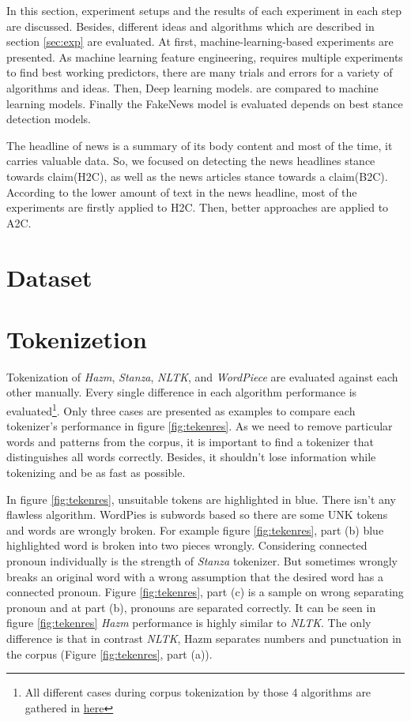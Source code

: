 In this section, experiment setups and the results of each experiment in each step are discussed. Besides, different ideas and algorithms which are described in section \ref{sec:exp} are evaluated. At first, machine-learning-based experiments are presented. As machine learning feature engineering, requires multiple experiments to find best working predictors, there are many trials and errors for a variety of algorithms and ideas. Then, Deep learning models. are compared to machine learning models. Finally the FakeNews model is evaluated depends on best stance detection models.

The headline of news is a summary of its body content and most of the time, it carries valuable data. So, we focused on detecting the news headlines stance towards claim(H2C), as well as the news articles stance towards a claim(B2C). According to the lower amount of text in the news headline, most of the experiments are firstly applied to H2C. Then, better approaches are applied to A2C.  


\section{Dataset}
\label{sec:dataset}



\section{Tokenizetion}
Tokenization of \textit{Hazm}, \textit{Stanza}, \textit{NLTK}, and \textit{WordPiece} are evaluated against each other manually. Every single difference in each algorithm performance is evaluated\footnote{All different cases during corpus tokenization by those 4 algorithms are gathered in \href{https://docs.google.com/document/d/1SlRBnoyLntLJ5yalWXZ1EqJ0wRj4DyiEMJdewkEkrTM/edit?usp=sharing}{here}}. Only three cases are presented as examples to compare each tokenizer's performance in figure \ref{fig:tekenres}. As we need to remove particular words and patterns from the corpus,  it is important to find a tokenizer that distinguishes all words correctly. Besides, it shouldn't lose information while tokenizing and be as fast as possible. 

In figure \ref{fig:tekenres}, unsuitable tokens are highlighted in blue. There isn't any flawless algorithm. WordPies is subwords based so there are some UNK tokens and words are wrongly broken. For example figure \ref{fig:tekenres}, part (b) blue highlighted word is broken into two pieces wrongly. Considering connected pronoun individually is the strength of \textit{Stanza} tokenizer. But sometimes  wrongly breaks an original word with a wrong assumption that the desired word has a connected pronoun. Figure \ref{fig:tekenres}, part (c) is a sample on wrong separating pronoun and at part (b), pronouns are separated correctly. It can be seen in figure \ref{fig:tekenres} \textit{Hazm} performance is highly similar to \textit{NLTK}. The only difference is that in contrast \textit{NLTK}, Hazm separates numbers and punctuation in the corpus (Figure \ref{fig:tekenres}, part (a)). 

